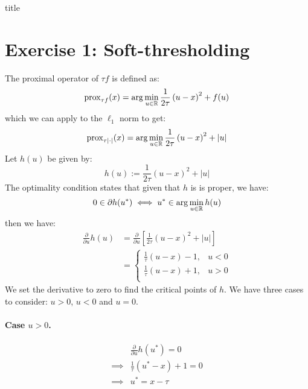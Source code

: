 \documentclass[12pt]{article}
\newcommand{\prox}{\operatorname{prox}}
\begin{document}
{title}

\tableofcontents




\section{Exercise 1: Soft-thresholding}
\label{sec:soft-thresholding}
The proximal operator of $\tau f$ is defined as:
\begin{equation*}
  \prox_{\tau f}(x) = \arg\min_{u \in \R} \frac{1}{2\tau}\left(u-x \right)^2 + f(u)
\end{equation*}
which we can apply to the $\ell_1$ norm to get:
\begin{equation*}
  \prox_{\tau |\cdot|}(x) = \arg\min_{u \in \R} \frac{1}{2\tau}\left(u-x \right)^2 + |u|
\end{equation*}
Let $h(u)$ be given by:
$$
  h(u) := \frac{1}{2\tau}\left(u-x \right)^2 + |u|
$$
The optimality condition states that given that $h$ is is proper, we have:
\begin{equation*}
  0 \in \partial h(u^*) \iff u^* \in \arg \min_{u \in \mathbb{R}} h(u)
\end{equation*}
then we have:
\begin{align*}
  \frac{\partial}{\partial u} h(u)
   & = \frac{\partial}{\partial u}  \left[\frac{1}{2\tau}\left(u-x \right)^2 + |u| \right] \\
   & =
  \begin{cases}
    \frac{1}{\tau}(u-x) - 1,  & u < 0 \\
    \frac{1}{\tau} (u-x) + 1, & u > 0 \\
  \end{cases}
\end{align*}
We set the derivative to zero to find the critical points of $h$. We have three cases to consider: $u > 0$, $u < 0$ and $u = 0$.
\paragraph{Case $u > 0$.}
\begin{align*}
           &
  \frac{\partial}{\partial u}  h(u^*) = 0 \\
  \implies &
  \frac{1}{\tau} (u^*-x) + 1 = 0          \\
  \implies &
  u^* = x - \tau                          \\
\end{align*}
\end{document}
